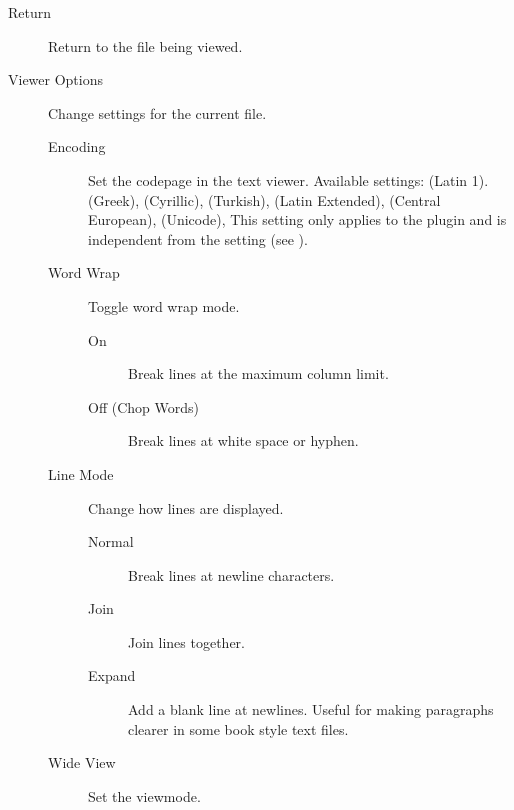 \begin{description}
\item[Return] Return to the file being viewed.
\item[Viewer Options] Change settings for the current file.
    \begin{description}
    \item[Encoding] Set the codepage in the text viewer.
    Available settings:
     (Latin 1).
     (Greek),
     (Cyrillic),
     (Turkish),
     (Latin Extended),
     (Central European),
     (Unicode),
    This setting only applies to the plugin and is independent from the
     setting (see ).
    \item[Word Wrap] Toggle word wrap mode.
        \begin{description}
            \item[On] Break lines at the maximum column limit.
            \item[Off (Chop Words)] Break lines at white space or hyphen.
        \end{description}
    \item[Line Mode] Change how lines are displayed.
        \begin{description}
            \item[Normal] Break lines at newline characters.
            \item[Join] Join lines together.
            \item[Expand] Add a blank line at newlines. Useful for making paragraphs
            clearer in some book style text files.
        \end{description}
    \item[Wide View] Set the viewmode.
        \begin{description}

\end{description}
\end{description}
\end{description}

